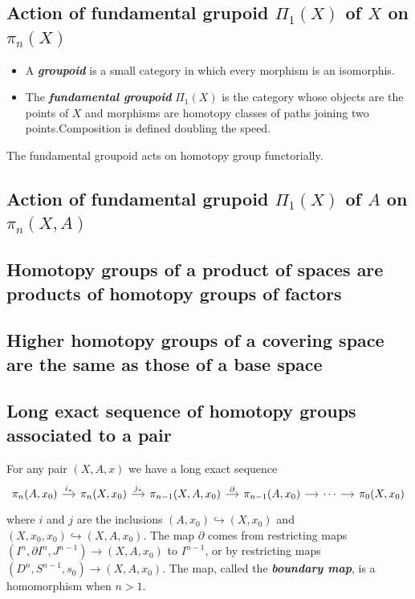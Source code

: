 \subsection*{Action of fundamental grupoid \texorpdfstring{$\Pi_1(X)$}{Π₁(X)} of \texorpdfstring{$X$}{X} on \texorpdfstring{$\pi_{n}(X)$}{π₁(X)}}
\begin{itemize}
	\item A \textit{\textbf{groupoid}} is a small category in which every morphism is an isomorphis.
	\item The \textit{\textbf{fundamental groupoid}} $\Pi_{1}(X)$ is the category whose objects are the points of  $X$ and morphisms are homotopy classes of paths joining two points.Composition is defined doubling the speed.
\end{itemize}

The fundamental groupoid acts on homotopy group functorially.

\subsection*{Action of fundamental grupoid \texorpdfstring{$\Pi_1(X)$}{Π₁(X)} of \texorpdfstring{$A$}{A} on \texorpdfstring{$\pi_{n}(X,A)$}{π₁(X,A)}}

\subsection{Homotopy groups of a product of spaces are products of homotopy groups of factors}

\subsection{Higher homotopy groups of a covering space are the same as those of a base space}

\subsection{Long exact sequence of homotopy groups associated to a pair}

For any pair $(X,A,x)$ we have a long exact sequence
\[\begin{tikzcd}[column sep=small]
	\pi_n(A,x_0)\arrow[r,"i_*"]&\pi_{n}(X,x_0)\arrow[r,"j_*"]&\pi_{n-1}(X,A,x_0)\arrow[r,"\partial"]&\pi_{n-1}(A,x_0)\arrow[r]&\cdots\arrow[r]&\pi_0(X,x_0)
\end{tikzcd}\]
where $i$ and $j$ are the inclusions $(A,x_0)\hookrightarrow(X,x_0)$ and $(X,x_0,x_0)\hookrightarrow(X,A,x_0)$. The map $\partial$ comes from restricting maps $(I^n,\partial I^n,J^{n-1})\to (X,A,x_0)$ to $I^{n-1}$, or by restricting maps $(D^n,S^{n-1},s_0)\to (X,A,x_0)$. The map, called the \textbf{\textit{boundary map}}, is a homomorphism when $n>1$.


